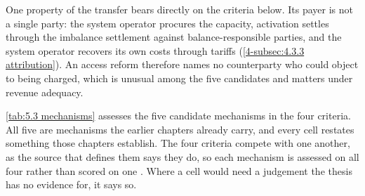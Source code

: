 One property of the transfer bears directly on the criteria below. Its payer is not a single party: the system operator procures the capacity, activation settles through the imbalance settlement against balance-responsible parties, and the system operator recovers its own costs through tariffs (\autoref{4-subsec:4.3.3 attribution}). An access reform therefore names no counterparty who could object to being charged, which is unusual among the five candidates and matters under revenue adequacy.

\autoref{tab:5.3 mechanisms} assesses the five candidate mechanisms in the four criteria. All five are mechanisms the earlier chapters already carry, and every cell restates something those chapters establish. The four criteria compete with one another, as the source that defines them says they do, so each mechanism is assessed on all four rather than scored on one \cite{bergaentzle_electricity_2019}. Where a cell would need a judgement the thesis has no evidence for, it says so.

